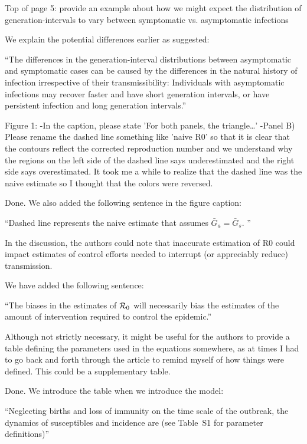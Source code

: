 \documentclass[12pt]{article}
\newcommand{\revtext}{\textsf}
\begin{document}
\revtext{Top of page 5: provide an example about how we might expect the distribution of generation-intervals to vary between symptomatic vs. asymptomatic infections}

We explain the potential differences earlier as suggested:

``The differences in the generation-interval distributions between asymptomatic and symptomatic cases can be caused by the differences in the natural history of infection irrespective of their transmissibility:
Individuals with asymptomatic infections may recover faster and have short generation intervals, or have persistent infection and long generation intervals.''

\revtext{Figure 1:
-In the caption, please state 'For both panels, the triangle…'
-Panel B) Please rename the dashed line something like 'naive R0' so that it is clear that the contours reflect the corrected reproduction number and we understand why the regions on the left side of the dashed line says underestimated and the right side says overestimated.  It took me a while to realize that the dashed line was the naive estimate so I thought that the colors were reversed.}

Done. We also added the following sentence in the figure caption:

``Dashed line represents the naive estimate that assumes $\bar G_a = \bar G_s$. ''

\revtext{In the discussion, the authors could note that inaccurate estimation of R0 could impact estimates of control efforts needed to interrupt (or appreciably reduce) transmission.}

We have added the following sentence:

``The biases in the estimates of ${\cal{R}}_0$ will necessarily bias the estimates of the amount of intervention required to control the epidemic.''

\revtext{Although not strictly necessary, it might be useful for the authors to provide a table defining the parameters used in the equations somewhere, as at times I had to go back and forth through the article to remind myself of how things were defined.  This could be a supplementary table.}

Done. We introduce the table when we introduce the model:

``Neglecting births and loss of immunity on the time scale of the outbreak, the dynamics of susceptibles and incidence are (see Table~S1 for parameter definitions)''
\end{document}
